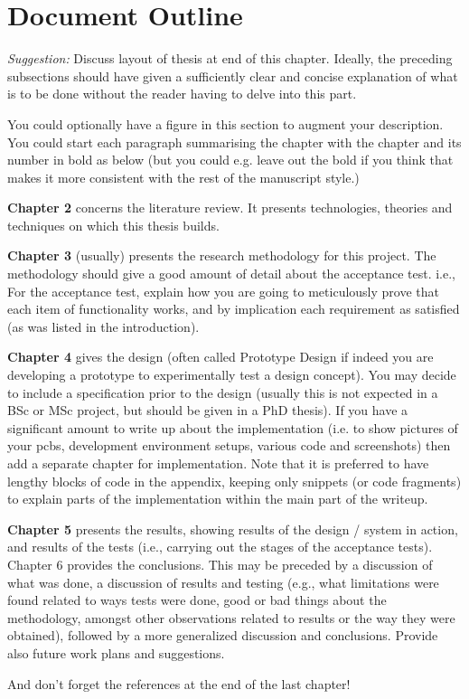 \section{Document Outline}

\emph{Suggestion:} Discuss layout of thesis at end of this chapter. Ideally, the preceding subsections should have given a sufficiently clear and concise explanation of what is to be done without the reader having to delve into this part.

You could optionally have a figure in this section to augment your description. You could start each paragraph summarising the chapter with the chapter and its number in bold as below (but you could e.g. leave out the bold if you think that makes it more consistent with the rest of the manuscript style.) 

\textbf{Chapter 2} concerns the literature review. It presents technologies, theories and techniques on which this thesis builds.

\textbf{Chapter 3} (usually) presents the research methodology for this project. The methodology should give a good amount of detail about the acceptance test. i.e., For the acceptance test, explain how you are going to meticulously prove that each item of functionality works, and by implication each requirement as satisfied (as was listed in the introduction).

\textbf{Chapter 4} gives the design (often called Prototype Design if indeed you are developing a prototype to experimentally test a design concept). You may decide to include a specification prior to the design (usually this is not expected in a BSc or MSc project, but should be given in a PhD thesis). If you have a significant amount to write up about the implementation (i.e. to show pictures of your pcbs, development environment setups, various code and screenshots) then add a separate chapter for implementation. Note that it is preferred to have lengthy blocks of code in the appendix, keeping only snippets (or code fragments) to explain parts of the implementation within the main part of the writeup.

\textbf{Chapter 5} presents the results, showing results of the design / system in action, and results of the tests (i.e., carrying out the stages of the acceptance tests).
Chapter 6 provides the conclusions. This may be preceded by a discussion of what was done, a discussion of results and testing (e.g., what limitations were found related to ways tests were done, good or bad things about the methodology, amongst other observations related to results or the way they were obtained), followed by a more generalized discussion and conclusions. Provide also future work plans and suggestions.

And don’t forget the references at the end of the last chapter!
